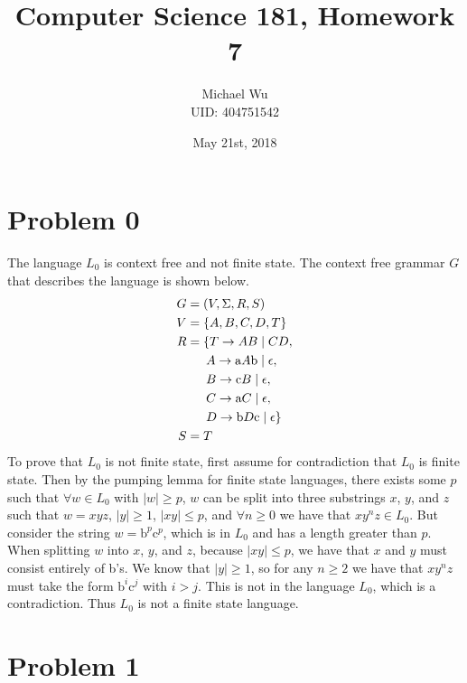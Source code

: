 \documentclass[12pt]{article}
\begin{document}
\title{Computer Science 181, Homework 7}
\date{May 21st, 2018}
\author{Michael Wu\\UID: 404751542}
\maketitle

\section*{Problem 0}

The language \(L_0\) is context free and not finite state. The context free grammar \(G\) that describes the language is shown below.
\begin{align*}
        G&=(V,\Sigma,R,S)\\
        V&=\{A,B,C,D,T\}\\
        R&=\{T\rightarrow AB \mid CD,\\
        &\hphantom{==}A\rightarrow \text{a}A\text{b} \mid \epsilon,\\
        &\hphantom{==}B\rightarrow \text{c}B \mid \epsilon,\\
        &\hphantom{==}C\rightarrow \text{a}C \mid \epsilon,\\
        &\hphantom{==}D\rightarrow \text{b}D\text{c} \mid \epsilon\}\\
        S&=T
\end{align*}
To prove that \(L_0\) is not finite state, first assume for contradiction that \(L_0\) is finite state. Then by the pumping lemma for finite state languages,
there exists some \(p\) such that \(\forall w\in L_0\) with \(|w|\geq p\), \(w\) can be split into three substrings \(x\), \(y\), and \(z\) such that \(w=xyz\),
\(|y|\geq 1\), \(|xy|\leq p\), and \(\forall n\geq 0\) we have that \(xy^nz\in L_0\). But consider the string \(w=\text{b}^p\text{c}^p\), which is in \(L_0\)
and has a length greater than \(p\). When splitting \(w\) into \(x\), \(y\), and \(z\), because \(|xy|\leq p\), we have that \(x\) and \(y\) must consist
entirely of b's. We know that \(|y|\geq 1\), so for any \(n\geq 2\) we have that \(xy^nz\) must take the form \(\text{b}^i\text{c}^j\) with \(i>j\). This
is not in the language \(L_0\), which is a contradiction. Thus \(L_0\) is not a finite state language.

\section*{Problem 1}
\end{document}

